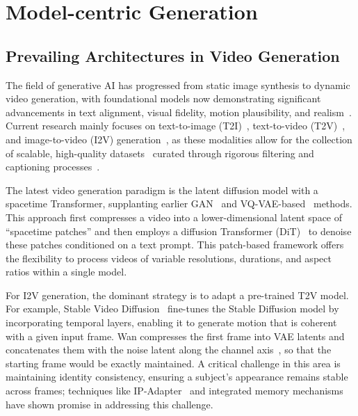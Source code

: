 \documentclass{article}
\begin{document}
\section{Model-centric Generation}
\label{modelcentric}
\subsection{Prevailing Architectures in Video Generation}

The field of generative AI has progressed from static image synthesis to dynamic video generation, with foundational models now demonstrating significant advancements in text alignment, visual fidelity, motion plausibility, and realism~\citep{liu2025improving}. Current research mainly focuses on text-to-image (T2I)~\citep{rombach2022high}, text-to-video (T2V)~\citep{yin2025towards}, and image-to-video (I2V) generation~\citep{xing2024survey}, as these modalities allow for the collection of scalable, high-quality datasets~\citep{wang2025koala} curated through rigorous filtering and captioning processes~\citep{chen2025avocado}. 

The latest video generation paradigm is the latent diffusion model with a spacetime Transformer, supplanting earlier GAN~\citep{goodfellow2020generative} and VQ-VAE-based~\citep{van2017neural} methods. This approach first compresses a video into a lower-dimensional latent space of ``spacetime patches'' and then employs a diffusion Transformer (DiT)~\citep{peebles2023scalable} to denoise these patches conditioned on a text prompt. This patch-based framework offers the flexibility to process videos of variable resolutions, durations, and aspect ratios within a single model.

For I2V generation, the dominant strategy is to adapt a pre-trained T2V model. For example, Stable Video Diffusion~\citep{blattmann2023stable} fine-tunes the Stable Diffusion model by incorporating temporal layers, enabling it to generate motion that is coherent with a given input frame. Wan compresses the first frame into VAE latents and concatenates them with the noise latent along the channel axis~\citep{wan2025wan}, so that the starting frame would be exactly maintained. A critical challenge in this area is maintaining identity consistency, ensuring a subject's appearance remains stable across frames; techniques like IP-Adapter~\citep{ye2023ip} and integrated memory mechanisms~\citep{yu2025context} have shown promise in addressing this challenge.
\end{document}
